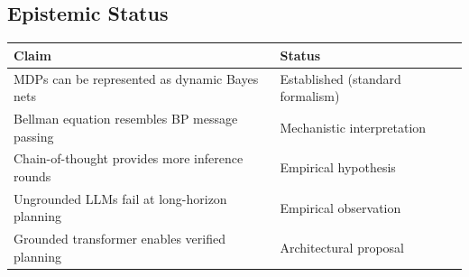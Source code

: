 \subsection*{Epistemic Status}

\begin{center}
\begin{tabular}{ll}
\toprule
Claim & Status \\
\midrule
MDPs can be represented as dynamic Bayes nets & Established (standard formalism) \\
Bellman equation resembles BP message passing & Mechanistic interpretation \\
Chain-of-thought provides more inference rounds & Empirical hypothesis \\
Ungrounded LLMs fail at long-horizon planning & Empirical observation \\
Grounded transformer enables verified planning & Architectural proposal \\
\bottomrule
\end{tabular}
\end{center}